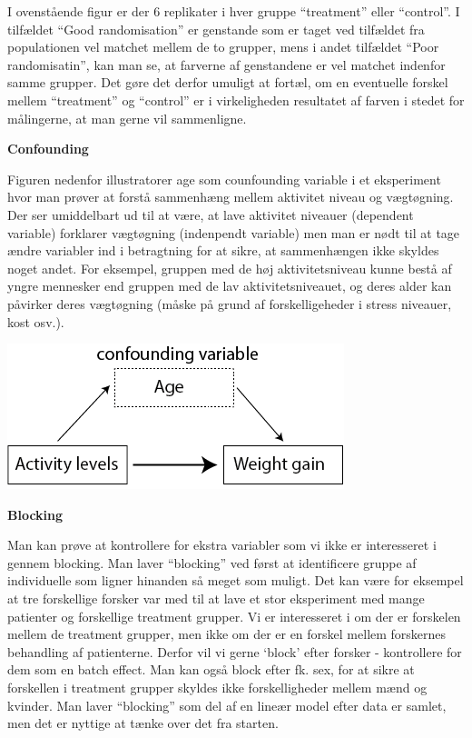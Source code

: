 \documentclass[
]{book}
\begin{document}
I ovenstående figur er der 6 replikater i hver gruppe ``treatment'' eller ``control''. I tilfældet ``Good randomisation'' er genstande som er taget ved tilfældet fra populationen vel matchet mellem de to grupper, mens i andet tilfældet ``Poor randomisatin'', kan man se, at farverne af genstandene er vel matchet indenfor samme grupper. Det gøre det derfor umuligt at fortæl, om en eventuelle forskel mellem ``treatment'' og ``control'' er i virkeligheden resultatet af farven i stedet for målingerne, at man gerne vil sammenligne.

\textbf{Confounding}

Figuren nedenfor illustratorer age som counfounding variable i et eksperiment hvor man prøver at forstå sammenhæng mellem aktivitet niveau og vægtøgning. Der ser umiddelbart ud til at være, at lave aktivitet niveauer (dependent variable) forklarer vægtøgning (indenpendt variable) men man er nødt til at tage ændre variabler ind i betragtning for at sikre, at sammenhængen ikke skyldes noget andet. For eksempel, gruppen med de høj aktivitetsniveau kunne bestå af yngre mennesker end gruppen med de lav aktivitetsniveauet, og deres alder kan påvirker deres vægtøgning (måske på grund af forskelligeheder i stress niveauer, kost osv.).

\includegraphics[width=0.6\linewidth]{plots/confounding_illus}

\textbf{Blocking}

Man kan prøve at kontrollere for ekstra variabler som vi ikke er interesseret i gennem blocking. Man laver ``blocking'' ved først at identificere gruppe af individuelle som ligner hinanden så meget som muligt. Det kan være for eksempel at tre forskellige forsker var med til at lave et stor eksperiment med mange patienter og forskellige treatment grupper. Vi er interesseret i om der er forskelen mellem de treatment grupper, men ikke om der er en forskel mellem forskernes behandling af patienterne. Derfor vil vi gerne `block' efter forsker - kontrollere for dem som en batch effect. Man kan også block efter fk. sex, for at sikre at forskellen i treatment grupper skyldes ikke forskelligheder mellem mænd og kvinder. Man laver ``blocking'' som del af en lineær model efter data er samlet, men det er nyttige at tænke over det fra starten.
\end{document}
